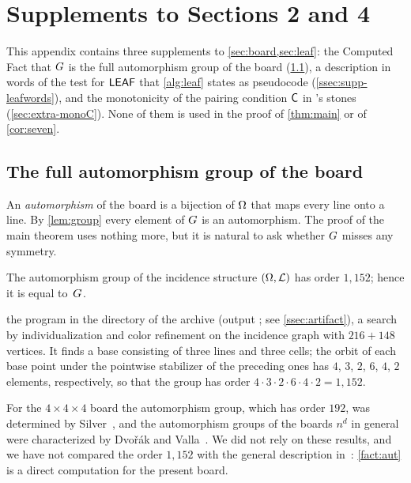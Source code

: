\section{Supplements to Sections 2 and 4}\label{sec:extra}

This appendix contains three supplements to \cref{sec:board,sec:leaf}: the Computed Fact that $G$ is the
full automorphism group of the board (\cref{ssec:aut}), a description in words of the test for $\mathsf{LEAF}$
that \cref{alg:leaf} states as pseudocode (\cref{ssec:supp-leafwords}), and the monotonicity of the pairing
condition $\mathsf{C}$ in \Breaker's stones (\cref{sec:extra-monoC}). None of them is used in the proof of
\cref{thm:main} or of \cref{cor:seven}.

\subsection{The full automorphism group of the board}\label{ssec:aut}

An \emph{automorphism} of the board is a bijection of $\Omega$ that maps every line onto a line. By
\cref{lem:group} every element of $G$ is an automorphism. The proof of the main theorem uses nothing
more, but it is natural to ask whether $G$ misses any symmetry.

\begin{fact}\label{fact:aut}
The automorphism group of the incidence structure $(\Omega,\mathcal{L})$ has order $1{,}152$; hence it is equal
to~$G$.

\established the program  in the directory  of the
archive (output ; see \cref{ssec:artifact}), a
search by individualization and color refinement on the incidence graph with $216+148$ vertices. It
finds a base consisting of three lines and three cells; the orbit of each base point under the pointwise
stabilizer of the preceding ones has $4$, $3$, $2$, $6$, $4$, $2$ elements, respectively, so that the
group has order $4\cdot3\cdot2\cdot6\cdot4\cdot2=1{,}152$.
\end{fact}

For the $4\times4\times4$ board the automorphism group, which has order $192$, was determined by
Silver~\cite{Silver1967}, and the automorphism groups of the boards $n^d$ in general were characterized
by Dvo\v{r}\'ak and Valla~\cite{DvorakValla2021}. We did not rely on these results, and we have not
compared the order $1{,}152$ with the general description in~\cite{DvorakValla2021}:
\cref{fact:aut} is a direct computation for the present board.

